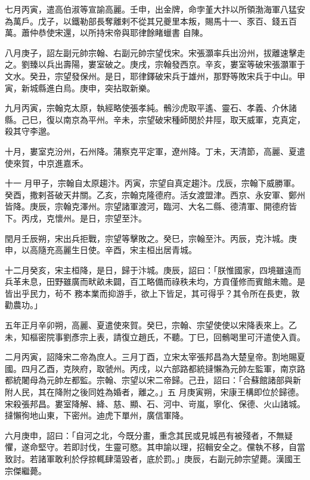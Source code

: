\begin{pinyinscope}
 七月丙寅，遣高伯淑等宣諭高麗。壬申，出金牌，命孛堇大抃以所領渤海軍八猛安為萬戶。戊子，以鐵勒部長奪離剌不從其兄夔里本叛，賜馬十一、豕百、錢五百萬。蕭仲恭使宋還，以所持宋帝與耶律餘睹蠟書
 自陳。



 八月庚子，詔左副元帥宗翰、右副元帥宗望伐宋。宋張灝率兵出汾州，拔離速擊走之。劉臻以兵出壽陽，婁室破之。庚戌，宗翰發西京。辛亥，婁室等破宋張灝軍于文水。癸丑，宗望發保州。是日，耶律鐸破宋兵于雄州，那野等敗宋兵于中山。甲寅，新城縣進白烏。庚申，突拈取新樂。



 九月丙寅，宗翰克太原，執經略使張孝純。鶻沙虎取平遙、靈石、孝義、介休諸縣。己巳，復以南京為平州。辛未，宗望破宋種師閔於井陘，取天威軍，克真定，殺其守李邈。



 十月，婁室克汾州，石州降。蒲察克平定軍，遼州降。丁未，天清節，高麗、夏遣使來賀，中京進嘉禾。



 十一
 月甲子，宗翰自太原趨汴。丙寅，宗望自真定趨汴。戊辰，宗翰下威勝軍。癸酉，撒剌荅破天井關。乙亥，宗翰克隆德府。活女渡盟津。西京、永安軍、鄭州皆降。庚辰，宗翰克澤州。宗望諸軍渡河，臨河、大名二縣、德清軍、開德府皆下。丙戌，克懷州。是日，宗望至汴。



 閏月壬辰朔，宋出兵拒戰，宗望等擊敗之。癸巳，宗翰至汴。丙辰，克汴城。庚申，以高隨充高麗生日使。辛酉，宋主桓出居青城。



 十二月癸亥，宋主桓降，是日，歸于汴城。庚辰，詔曰：「朕惟國家，四境雖遠而兵革未息，田野雖廣而畎畝未闢，百工略備而祿秩未均，方貢僅修而賓館未贍。是皆出乎民力，茍不
 務本業而抑游手，欲上下皆足，其可得乎？其令所在長吏，敦勸農功。」



 五年正月辛卯朔，高麗、夏遣使來賀。癸巳，宗翰、宗望使使以宋降表來上。乙未，知樞密院事劉彥宗上表，請復立趙氏，不聽。丁巳，回鶻喝里可汗遣使入貢。



 二月丙寅，詔降宋二帝為庶人。三月丁酉，立宋太宰張邦昌為大楚皇帝。割地賜夏國。四月乙酉，克陜府，取虢州。丙戌，以六部路都統撻懶為元帥左監軍，南京路都統闍母為元帥左都監。宗翰、宗望以宋二帝歸。己丑，詔曰：「合蘇館諸部與新附人民，其在降附之後同姓為婚者，離之。」五
 月庚寅朔，宋康王構即位於歸德。宋殺張邦昌。婁室降解、絳、慈、顯、石、河中、岢嵐，寧化、保德、火山諸城。撻懶徇地山東，下密州。迪虎下單州，廣信軍降。



 六月庚申，詔曰：「自河之北，今既分畫，重念其民或見城邑有被殘者，不無疑懼，遂命堅守。若即討伐，生靈可愍。其申諭以理，招輯安全之。儻執不移，自當致討。若諸軍敢利於俘掠輒肆蕩毀者，底於罰。」庚辰，右副元帥宗望薨。漢國王宗傑繼薨。




\end{pinyinscope}
